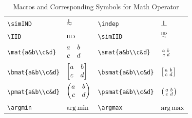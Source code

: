 \documentclass[11pt,a4paper]{article}
\begin{document}
\begin{table}[h]
\begin{tabular}{|>{\centering\arraybackslash}m{3cm}|>{\centering\arraybackslash}m{3cm}||>{\centering\arraybackslash}m{3cm}|>{\centering\arraybackslash}m{3cm}|}
\verb|\simIND|&$\simIND$ & \verb|\indep|& $\indep$\\
\verb|\IID|& $\textsc{iid}$ & \verb|\simIID| &$\overset{ \textsc{iid} }{\sim}$\\
\verb|\mat{a&b\\c&d}|& $\begin{matrix} a&b\\c&d \end{matrix}$ &\verb|\smat{a&b\\c&d}|  &$\begin{smallmatrix} a&b\\c&d \end{smallmatrix}$\\
\verb|\bmat{a&b\\c&d}|& $\begin{bmatrix} a&b\\c&d \end{bmatrix}$& \verb|\bsmat{a&b\\c&d}| & $\begin{bsmallmatrix} a&b\\c&d \end{bsmallmatrix}$\\
\verb|\pmat{a&b\\c&d}| & $\begin{pmatrix} a&b\\c&d \end{pmatrix}$& \verb|\psmat{a&b\\c&d}| &$\begin{psmallmatrix} a&b\\c&d \end{psmallmatrix}$\\
\verb|\argmin| & $\operatorname*{arg\,min}$ &\verb|\argmax| & $\operatorname*{arg\,max}$ \\
\hline
\end{tabular}
\caption{Macros and Corresponding Symbols for Math Operator}
\label{table1}
\end{table}
\end{document}
